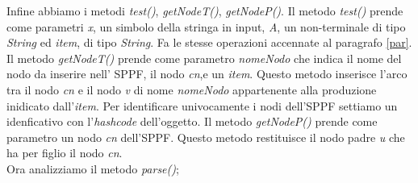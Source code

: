 Infine abbiamo i metodi \textit{test()}, \textit{getNodeT()}, \textit{getNodeP()}. Il metodo \textit{test()} prende come parametri \textit{x}, un simbolo della stringa in input, \textit{A}, un non-terminale di tipo \textit{String} ed \textit{item}, di tipo \textit{String}. Fa le stesse operazioni accennate al paragrafo \ref{par}. Il metodo \textit{getNodeT()} prende come parametro \textit{nomeNodo} che indica il nome del nodo da inserire nell' SPPF, il nodo \textit{cn},e un \textit{item}. Questo metodo inserisce l'arco tra il nodo \textit{cn} e il nodo \textit{v} di nome \textit{nomeNodo} appartenente alla produzione inidicato dall'\textit{item}. Per identificare univocamente i nodi dell'SPPF settiamo un idenficativo con l'\textit{hashcode} dell'oggetto. Il metodo \textit{getNodeP()} prende come parametro un nodo \textit{cn} dell'SPPF. Questo metodo restituisce il nodo padre \textit{u} che ha per figlio il nodo \textit{cn}.\\
Ora analizziamo il metodo \textit{parse()};

